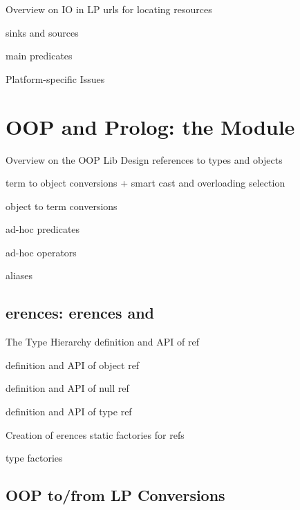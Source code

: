 \documentclass[handout]{beamer}
\begin{document}
\begin{frame}[allowframebreaks]{Overview on IO in LP}
    urls for locating resources

    sinks and sources

    main predicates
\end{frame}

\begin{frame}[allowframebreaks]{Platform-specific Issues}

\end{frame}

\section{OOP and Prolog: the  Module}

\begin{frame}[allowframebreaks]{Overview on the OOP Lib Design}
    references to types and objects

    term to object conversions
        + smart cast and overloading selection

    object to term conversions

    ad-hoc predicates

    ad-hoc operators

    aliases
\end{frame}

\subsection{erences: erences and }

\begin{frame}[allowframebreaks]{The  Type Hierarchy}
    definition and API of ref

    definition and API of object ref

    definition and API of null ref

    definition and API of type ref
\end{frame}

\begin{frame}[allowframebreaks]{Creation of erences}
    static factories for refs

    type factories
\end{frame}

\subsection{OOP to/from LP Conversions}
\end{document}
